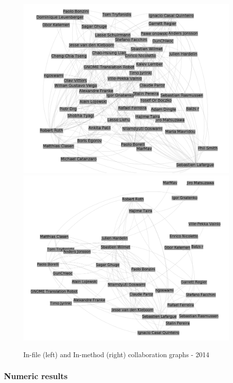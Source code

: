 \documentclass[a4paper]{article}
\begin{document}
\begin{figure}[ht]
\begin{center}
\includegraphics[scale=0.17]{g2014files.png} 
\includegraphics[scale=0.17]{g2014methods.png}
\caption{In-file (left) and In-method (right) collaboration graphs - 2014}
\label{fig:fixme2}
\end{center}
\end{figure}

\subsubsection{Numeric results}
\end{document}
